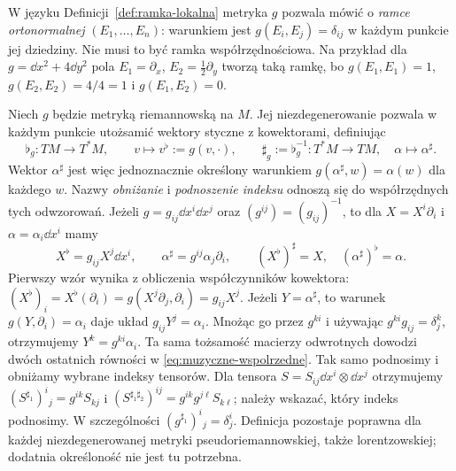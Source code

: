 W języku Definicji~\ref{def:ramka-lokalna} metryka $g$
pozwala mówić o \emph{ramce ortonormalnej} $(E_1,\ldots,E_n)$:
warunkiem jest $g(E_i,E_j)=\delta_{ij}$ w każdym punkcie
jej dziedziny. Nie musi to być ramka współrzędnościowa.
Na przykład dla $g=\dd x^2+4\dd y^2$ pola
$E_1=\partial_x$, $E_2=\frac12\partial_y$ tworzą taką ramkę,
bo $g(E_1,E_1)=1$, $g(E_2,E_2)=4/4=1$
i $g(E_1,E_2)=0$.

\begin{definicja}
\label{def:izomorfizmy-muzyczne}
Niech $g$ będzie metryką riemannowską na $M$.
Jej niezdegenerowanie pozwala w każdym punkcie utożsamić
wektory styczne z kowektorami, definiując
\begin{equation}\label{eq:muzyczne-flat-sharp}
 \flat_g\colon TM\longrightarrow T^*M,\qquad
 v\longmapsto v^\flat:=g(v,\cdot),\qquad
 \sharp_g:=\flat_g^{-1}\colon T^*M\longrightarrow TM,
 \quad \alpha\longmapsto\alpha^\sharp.
\end{equation}
Wektor $\alpha^\sharp$ jest więc jednoznacznie określony
warunkiem $g(\alpha^\sharp,w)=\alpha(w)$ dla każdego $w$.
Nazwy \emph{obniżanie} i \emph{podnoszenie indeksu}
odnoszą się do współrzędnych tych odwzorowań.
Jeżeli $g=g_{ij}\dd x^i\dd x^j$ oraz
$(g^{ij})=(g_{ij})^{-1}$, to dla
$X=X^i\partial_i$ i $\alpha=\alpha_i\dd x^i$ mamy
\begin{equation}\label{eq:muzyczne-wspolrzedne}
 X^\flat=g_{ij}X^j\dd x^i,\qquad
 \alpha^\sharp=g^{ij}\alpha_j\partial_i,
 \qquad (X^\flat)^\sharp=X,\quad
 (\alpha^\sharp)^\flat=\alpha.
\end{equation}
Pierwszy wzór wynika z obliczenia współczynników kowektora:
$(X^\flat)_i=X^\flat(\partial_i)
=g(X^j\partial_j,\partial_i)=g_{ij}X^j$.
Jeżeli $Y=\alpha^\sharp$, to warunek
$g(Y,\partial_i)=\alpha_i$ daje układ $g_{ij}Y^j=\alpha_i$.
Mnożąc go przez $g^{ki}$ i używając
$g^{ki}g_{ij}=\delta^k_j$, otrzymujemy $Y^k=g^{ki}\alpha_i$.
Ta sama tożsamość macierzy odwrotnych dowodzi dwóch
ostatnich równości w \eqref{eq:muzyczne-wspolrzedne}.
Tak samo podnosimy i obniżamy wybrane indeksy tensorów.
Dla tensora $S=S_{ij}\dd x^i\otimes\dd x^j$ otrzymujemy
$(S^{\sharp_1})^i{}_j=g^{ik}S_{kj}$ i
$(S^{\sharp_1\sharp_2})^{ij}=g^{ik}g^{j\ell}S_{k\ell}$;
należy wskazać, który indeks podnosimy.
W szczególności $(g^{\sharp_1})^i{}_j=\delta^i_j$.
Definicja pozostaje poprawna dla każdej niezdegenerowanej
metryki pseudoriemannowskiej, także lorentzowskiej;
dodatnia określoność nie jest tu potrzebna.
\end{definicja}

